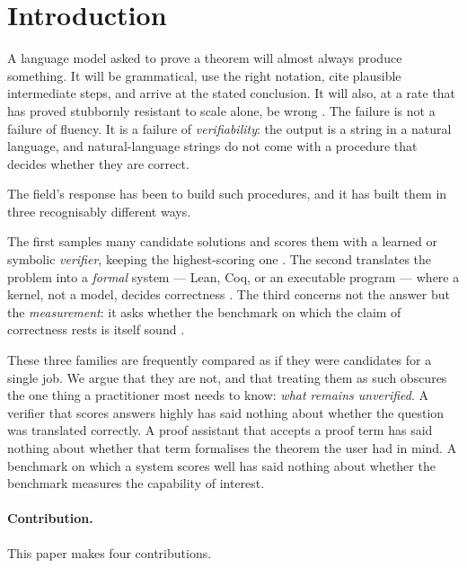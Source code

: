 \documentclass[11pt,a4paper]{article}
\begin{document}
\section{Introduction}
\label{sec:intro}

A language model asked to prove a theorem will almost always produce something.
It will be grammatical, use the right notation, cite plausible intermediate
steps, and arrive at the stated conclusion. It will also, at a rate that has
proved stubbornly resistant to scale alone, be wrong
\citep{cobbe2021gsm8k,lightman2024verify,huang2024selfcorrect}. The failure is
not a failure of fluency. It is a failure of \emph{verifiability}: the output
is a string in a natural language, and natural-language strings do not come
with a procedure that decides whether they are correct.

The field's response has been to build such procedures, and it has built them
in three recognisably different ways.

The first samples many candidate solutions and scores them with a learned or
symbolic \emph{verifier}, keeping the highest-scoring one
\citep{cobbe2021gsm8k,lightman2024verify}. The second translates the problem
into a \emph{formal} system --- Lean, Coq, or an executable program --- where a
kernel, not a model, decides correctness
\citep{wu2022autoformalization,jiang2023dsp,yang2023leandojo}. The third
concerns not the answer but the \emph{measurement}: it asks whether the
benchmark on which the claim of correctness rests is itself sound
\citep{zhou2023cheater,sainz2023contamination,white2024livebench}.

These three families are frequently compared as if they were candidates for a
single job. We argue that they are not, and that treating them as such obscures
the one thing a practitioner most needs to know: \emph{what remains
unverified}. A verifier that scores answers highly has said nothing about
whether the question was translated correctly. A proof assistant that accepts a
proof term has said nothing about whether that term formalises the theorem the
user had in mind. A benchmark on which a system scores well has said nothing
about whether the benchmark measures the capability of interest.

\paragraph{Contribution.} This paper makes four contributions.
\end{document}
